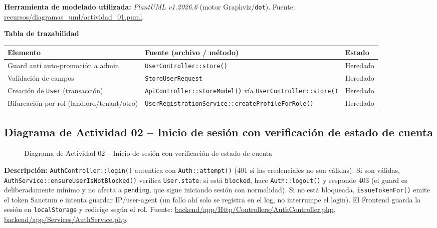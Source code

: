\bigskip
{\sloppy\noindent\textbf{Herramienta de modelado utilizada:} \textit{PlantUML v1.2026.6} (motor Graphviz/\texttt{dot}). Fuente: \url{recursos/diagramas_uml/actividad_01.puml}.\par}

\bigskip
\noindent\textbf{Tabla de trazabilidad}
\begin{longtable}{|L{4cm}|L{7.5cm}|M{2.3cm}|}
\hline
{} \textbf{Elemento} & \textbf{Fuente (archivo / método)} & \textbf{Estado} \\ \hline
\endhead
Guard anti auto-promoción a admin & \texttt{UserController::store()} & Heredado \\ \hline
Validación de campos & \texttt{StoreUserRequest} & Heredado \\ \hline
Creación de \texttt{User} (transacción) & \texttt{ApiController::storeModel()} vía \texttt{UserController::store()} & Heredado \\ \hline
Bifurcación por rol (landlord/tenant/otro) & \texttt{UserRegistrationService::createProfileForRole()} & Heredado \\ \hline
\end{longtable}
\clearpage

\subsection{Diagrama de Actividad 02 -- Inicio de sesión con verificación de estado de cuenta}
\begin{figure}[H]
    \centering
    \caption{Diagrama de Actividad 02 -- Inicio de sesión con verificación de estado de cuenta}
    \label{fig:actividad02}
\end{figure}

{\sloppy\noindent\textbf{Descripción:} \texttt{AuthController::login()} autentica con \texttt{Auth::attempt()} (401 si las credenciales no son válidas). Si son válidas, \texttt{AuthService::ensureUserIsNotBlocked()} verifica \texttt{User.state}: si está \texttt{blocked}, hace \texttt{Auth::logout()} y responde 403 (el guard es deliberadamente mínimo y no afecta a \texttt{pending}, que sigue iniciando sesión con normalidad). Si no está bloqueada, \texttt{issueTokenFor()} emite el token Sanctum e intenta guardar IP/user-agent (un fallo ahí solo se registra en el log, no interrumpe el login). El Frontend guarda la sesión en \texttt{localStorage} y redirige según el rol. Fuente: \url{backend/app/Http/Controllers/AuthController.php}, \url{backend/app/Services/AuthService.php}.\par}

